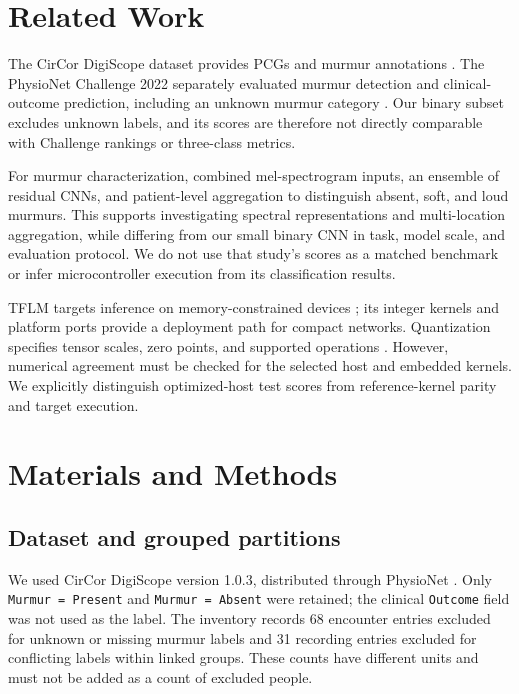 \documentclass[9pt,twocolumn,twoside,lineno]{MSBJournal}
\begin{document}
\section{Related Work}
The CirCor DigiScope dataset provides PCGs and murmur annotations \citep{oliveira2022circor,circor103}. The PhysioNet Challenge 2022 separately evaluated murmur detection and clinical-outcome prediction, including an unknown murmur category \citep{reyna2023challenge}. Our binary subset excludes unknown labels, and its scores are therefore not directly comparable with Challenge rankings or three-class metrics.

For murmur characterization, \citet{elola2023grading} combined mel-spectrogram inputs, an ensemble of residual CNNs, and patient-level aggregation to distinguish absent, soft, and loud murmurs. This supports investigating spectral representations and multi-location aggregation, while differing from our small binary CNN in task, model scale, and evaluation protocol. We do not use that study's scores as a matched benchmark or infer microcontroller execution from its classification results.

TFLM targets inference on memory-constrained devices \citep{david2021tflm}; its integer kernels and platform ports provide a deployment path for compact networks. Quantization specifies tensor scales, zero points, and supported operations \citep{int8spec}. However, numerical agreement must be checked for the selected host and embedded kernels. We explicitly distinguish optimized-host test scores from reference-kernel parity and target execution.

\section{Materials and Methods}
\subsection{Dataset and grouped partitions}
We used CirCor DigiScope version 1.0.3, distributed through PhysioNet \citep{circor103,pollard_physionet_2026}. Only \texttt{Murmur = Present} and \texttt{Murmur = Absent} were retained; the clinical \texttt{Outcome} field was not used as the label. The inventory records 68 encounter entries excluded for unknown or missing murmur labels and 31 recording entries excluded for conflicting labels within linked groups. These counts have different units and must not be added as a count of excluded people.
\end{document}
